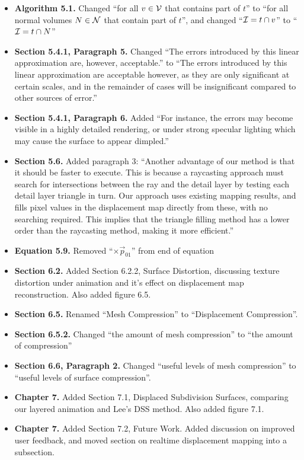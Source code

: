 \documentclass[11pt,a4paper]{book}
\begin{document}
\begin{itemize}
\item{\bf Algorithm 5.1.}
Changed ``for all $v \in {\cal V}$ that contains part of $t$'' to ``for all normal volumes $N \in {\cal N}$ that contain part of $t$'', and changed ``${\cal I} = t \cap v$'' to ``${\cal I} = t \cap N$''

\item{\bf Section 5.4.1, Paragraph 5.}
Changed ``The errors introduced by this linear approximation are, however, acceptable.'' to ``The errors introduced by this linear approximation are acceptable however, as they are only significant at certain scales, and in the remainder of cases will be insignificant compared to other sources of error.''

\item{\bf Section 5.4.1, Paragraph 6.}
Added ``For instance, the errors may become visible in a highly detailed rendering, or under strong specular lighting which may cause the surface to appear dimpled.''

\item{\bf Section 5.6.}
Added paragraph 3: ``Another advantage of our method is that it should be faster to execute. This is because a raycasting approach must search for intersections between the ray and the detail layer by testing each detail layer triangle in turn. Our approach uses existing mapping results, and fills pixel values in the displacement map directly from these, with no searching required. This implies that the triangle filling method has a lower order than the raycasting method, making it more efficient.''

\item{\bf Equation 5.9.}
Removed ``$\times \vec{p}_{01}$'' from end of equation

\item{\bf Section 6.2.}
Added Section 6.2.2, Surface Distortion, discussing texture distortion under animation and it's effect on displacement map reconstruction. Also added figure 6.5.

\item{\bf Section 6.5.}
Renamed ``Mesh Compression'' to ``Displacement Compression''.

\item{\bf Section 6.5.2.}
Changed ``the amount of mesh compression'' to ``the amount of compression''

\item{\bf Section 6.6, Paragraph 2.}
Changed ``useful levels of mesh compression'' to ``useful levels of surface compression''.

\item{\bf Chapter 7.}
Added Section 7.1, Displaced Subdivision Surfaces, comparing our layered animation and Lee's DSS method. Also added figure 7.1.

\item{\bf Chapter 7.}
Added Section 7.2, Future Work. Added discussion on improved user feedback, and moved section on realtime displacement mapping into a subsection.

\end{itemize}
\end{document}
